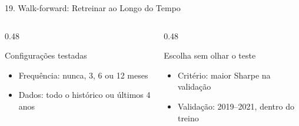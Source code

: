 \documentclass[aspectratio=169,10pt,t]{beamer}
\newenvironment{altura}[2][c]{\begin{minipage}[t][#2][#1]{\linewidth}}{\end{minipage}}
\begin{document}
\begin{frame}{19. Walk-forward: Retreinar ao Longo do Tempo}
  \vskip 0.35cm
  \begin{columns}[T,onlytextwidth]
    \begin{column}{0.48\textwidth}
      \begin{block}{Configurações testadas}
        \begin{altura}{1.1cm}
          \small
          \begin{itemize}\setlength{\itemsep}{2pt}
            \item Frequência: nunca, 3, 6 ou 12 meses
            \item Dados: todo o histórico ou últimos 4 anos
          \end{itemize}
        \end{altura}
      \end{block}
    \end{column}
    \begin{column}{0.48\textwidth}
      \begin{alertblock}{Escolha sem olhar o teste}
        \begin{altura}{1.1cm}
          \small
          \begin{itemize}\setlength{\itemsep}{2pt}
            \item Critério: maior Sharpe na validação
            \item Validação: 2019--2021, dentro do treino
          \end{itemize}
        \end{altura}
      \end{alertblock}
    \end{column}
  \end{columns}

\end{frame}
\end{document}
